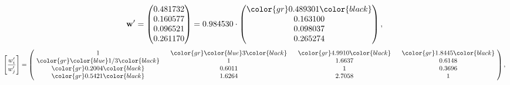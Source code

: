 \begin{example}
\begin{equation*}
\mathbf{w}^{\prime} =
\begin{pmatrix}
0.481732\\
0.160577\\
0.096521\\
0.261170
\end{pmatrix} =
0.984530\cdot
\begin{pmatrix}
\color{gr} 0.489301\color{black} \\
0.163100\\
0.098037\\
0.265274
\end{pmatrix},
\end{equation*}
\begin{equation*}
\left[ \frac{{w}^{\prime}_i}{{w}^{\prime}_j} \right] =
\begin{pmatrix}
$\,\,$ 1 $\,\,$ & $\,\,$\color{gr} \color{blue} 3\color{black} $\,\,$ & $\,\,$\color{gr} 4.9910\color{black} $\,\,$ & $\,\,$\color{gr} 1.8445\color{black} $\,\,$ \\
$\,\,$\color{gr} \color{blue}  1/3\color{black} $\,\,$ & $\,\,$ 1 $\,\,$ & $\,\,$1.6637$\,\,$ & $\,\,$0.6148  $\,\,$ \\
$\,\,$\color{gr} 0.2004\color{black} $\,\,$ & $\,\,$0.6011$\,\,$ & $\,\,$ 1 $\,\,$ & $\,\,$0.3696 $\,\,$ \\
$\,\,$\color{gr} 0.5421\color{black} $\,\,$ & $\,\,$1.6264$\,\,$ & $\,\,$2.7058$\,\,$ & $\,\,$ 1  $\,\,$ \\
\end{pmatrix},
\end{equation*}
\end{example}
\newpage
